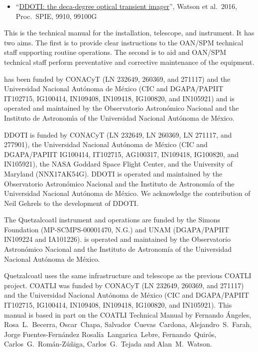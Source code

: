 \begin{itemize}
    \item “\href{bibliography/spie-ddoti-2016.pdf}{DDOTI: the deca-degree optical transient imager}”, Watson et al.\ 2016, Proc.\ SPIE, 9910, 99100G
\end{itemize}

\fi

\ifquetzalcoatl

This is the technical manual for the {\projectname} installation, telescope, and instrument. It has two aims. The first is to provide clear instructions to the OAN/SPM technical staff supporting routine operations. The second is to aid {\projectname} and OAN/SPM technical staff perform preventative and corrective maintenance of the equipment.

\fi

\ifcoatli
{\projectname} has been funded by CONACyT (LN 232649, 260369, and 271117)
and the Universidad Nacional Aut\'onoma de M\'exico (CIC and
DGAPA/PAPIIT IT102715, IG100414, IN109408, IN109418, IG100820, and IN105921) and is operated and
maintained by the Observatorio Astron\'omico Nacional and the Instituto
de Astronom{\'\i}a of the Universidad Nacional Aut\'onoma de M\'exico.
\fi

\ifddoti
DDOTI is funded by CONACyT (LN 232649, LN 260369, LN 271117, and 277901), the Universidad Nacional Autónoma de México (CIC and DGAPA/PAPIIT IG100414, IT102715, AG100317, IN109418, IG100820, and IN105921), the NASA Goddard Space Flight Center, and the University of Maryland (NNX17AK54G). DDOTI is operated and maintained by the Observatorio Astronómico Nacional and the Instituto de Astronomía of the Universidad Nacional Autónoma de México. We acknowledge the contribution of Neil Gehrels to the development of DDOTI.
\fi

\ifquetzalcoatl
The Quetzalcoatl instrument and operations are funded by the Simons Foundation (MP-SCMPS-00001470, N.G.) and UNAM (DGAPA/PAPIIT IN109224 and IA101226). {\projectname} is operated and maintained by the Observatorio Astronómico Nacional and the Instituto de Astronomía of the Universidad Nacional Autónoma de México.

Quetzalcoatl uses the same infrastructure and telescope as the previous COATLI project.
COATLI was funded by CONACyT (LN 232649, 260369, and 271117)
and the Universidad Nacional Aut\'onoma de M\'exico (CIC and
DGAPA/PAPIIT IT102715, IG100414, IN109408, IN109418, IG100820, and IN105921).
This manual is based in part on the COATLI Technical Manual by
Fernando Ángeles,
Rosa~L.~Becerra,
Oscar~Chapa,
Salvador~Cuevas~Cardona,
Alejandro~S.~Farah,
Jorge Fuentes-Fernández
Rosalía~Langarica~Lebre,
Fernando~Quirós,
Carlos~G.~Román-Zúñiga,
Carlos~G.~Tejada
and
Alan~M.~Watson.
\fi